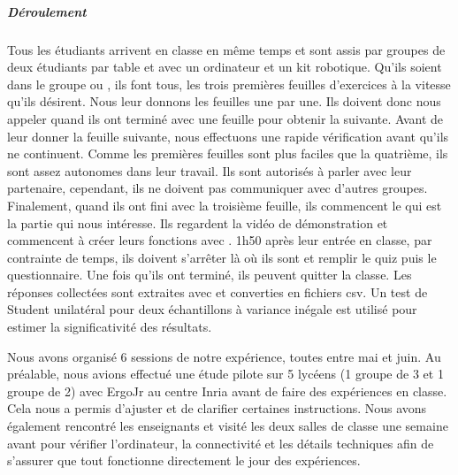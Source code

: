             \subparagraph{Déroulement}
                Tous les étudiants arrivent en classe en même temps et sont assis par groupes de deux étudiants par table et avec un ordinateur et un kit robotique.
                Qu'ils soient dans le groupe  ou , ils font tous, les trois premières feuilles d'exercices à la vitesse qu'ils désirent. Nous leur donnons les feuilles une par une. Ils doivent donc nous appeler quand ils ont terminé avec une feuille pour obtenir la suivante. Avant de leur donner la feuille suivante, nous effectuons une rapide vérification avant qu’ils ne continuent. Comme les premières feuilles sont plus faciles que la quatrième, ils sont assez autonomes dans leur travail. Ils sont autorisés à parler avec leur partenaire, cependant, ils ne doivent pas communiquer avec d'autres groupes. 
                Finalement, quand ils ont fini avec la troisième feuille, ils commencent le  qui est la partie qui nous intéresse. Ils regardent la vidéo de démonstration et commencent à créer leurs fonctions avec . 1h50 après leur entrée en classe, par contrainte de temps, ils doivent s'arrêter là où ils sont et remplir le quiz puis le questionnaire. Une fois qu'ils ont terminé, ils peuvent quitter la classe.
                Les réponses collectées sont extraites avec  et converties en fichiers csv. Un test de Student unilatéral pour deux échantillons à variance inégale est utilisé pour estimer la significativité des résultats.\par%
                Nous avons organisé 6 sessions de notre expérience, toutes entre mai et juin. Au préalable, nous avions effectué une étude pilote sur 5 lycéens (1 groupe de 3 et 1 groupe de 2) avec ErgoJr au centre Inria avant de faire des expériences en classe. Cela nous a permis d'ajuster et de clarifier certaines instructions. Nous avons également rencontré les enseignants et visité les deux salles de classe une semaine avant pour vérifier l’ordinateur, la connectivité et les détails techniques afin de s’assurer que tout fonctionne directement le jour des expériences.

